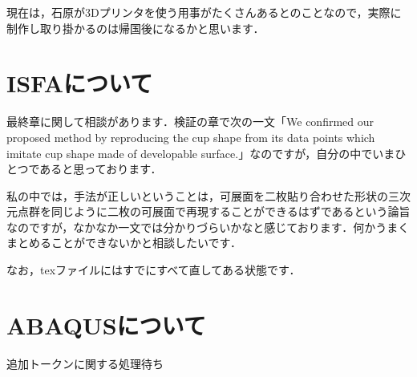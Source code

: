 \documentclass[11pt]{jsarticle}
\begin{document}
		現在は，石原が3Dプリンタを使う用事がたくさんあるとのことなので，実際に制作し取り掛かるのは帰国後になるかと思います．
	\section{ISFAについて}
		最終章に関して相談があります．検証の章で次の一文「We confirmed our proposed method by reproducing the cup shape from its data points which imitate cup shape made of developable surface.」なのですが，自分の中でいまひとつであると思っております．
		
		私の中では，手法が正しいということは，可展面を二枚貼り合わせた形状の三次元点群を同じように二枚の可展面で再現することができるはずであるという論旨なのですが，なかなか一文では分かりづらいかなと感じております．何かうまくまとめることができないかと相談したいです．
		
		なお，texファイルにはすでにすべて直してある状態です．
	\section{ABAQUSについて}
		追加トークンに関する処理待ち	
		
	
	\newpage
\vspace{10cm}

\vspace{14cm}
	\articleSPRfour
	\articleSPRfive
\end{document}
